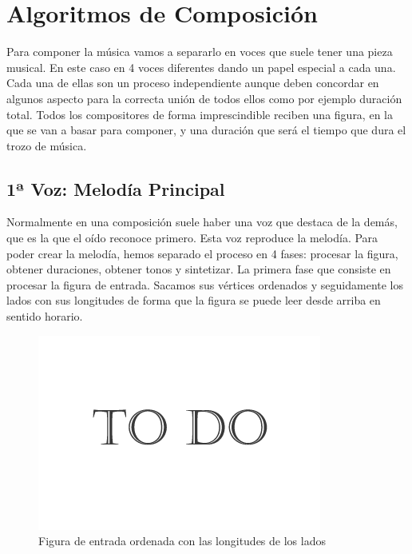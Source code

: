 \section{Algoritmos de Composición}

Para componer la música vamos a separarlo en voces que suele tener una pieza musical. En este caso en 4 voces diferentes dando un papel especial a cada una. Cada una de ellas son un proceso independiente aunque deben concordar en algunos aspecto para la correcta unión de todos ellos como por ejemplo duración total. Todos los compositores de forma imprescindible reciben una figura, en la que se van a basar para componer, y una duración que será el tiempo que dura el trozo de música. 

\subsection{1ª Voz: Melodía Principal}

Normalmente en una composición suele haber una voz que destaca de la demás, que es la que el oído reconoce primero. Esta voz reproduce la melodía. Para poder crear la melodía, hemos separado el proceso en 4 fases: procesar la figura, obtener duraciones, obtener tonos y sintetizar. 
La primera fase que consiste en procesar la figura de entrada. Sacamos sus vértices ordenados y seguidamente los lados con sus longitudes de forma que la figura se puede leer desde arriba en sentido horario.
		\begin{figure}[htbp]
		\centering
		\hspace*{0.0in}
		\includegraphics[scale=0.57]{graphics/todo.png}
		\caption{Figura de entrada ordenada con las longitudes de los lados}
		\label{fig:Figura1Voz1}
		\end{figure}

